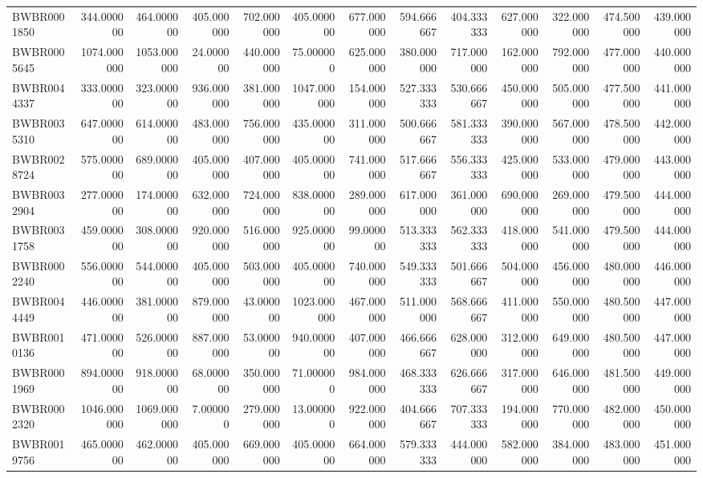 \begin{longtable}{lrrrrrrrrrrrr}
BWBR0001850 & 344.000000 & 464.000000 & 405.000000 & 702.000000 & 405.000000 & 677.000000 & 594.666667 & 404.333333 & 627.000000 & 322.000000 & 474.500000 & 439.000000 \\
BWBR0005645 & 1074.000000 & 1053.000000 & 24.000000 & 440.000000 & 75.000000 & 625.000000 & 380.000000 & 717.000000 & 162.000000 & 792.000000 & 477.000000 & 440.000000 \\
BWBR0044337 & 333.000000 & 323.000000 & 936.000000 & 381.000000 & 1047.000000 & 154.000000 & 527.333333 & 530.666667 & 450.000000 & 505.000000 & 477.500000 & 441.000000 \\
BWBR0035310 & 647.000000 & 614.000000 & 483.000000 & 756.000000 & 435.000000 & 311.000000 & 500.666667 & 581.333333 & 390.000000 & 567.000000 & 478.500000 & 442.000000 \\
BWBR0028724 & 575.000000 & 689.000000 & 405.000000 & 407.000000 & 405.000000 & 741.000000 & 517.666667 & 556.333333 & 425.000000 & 533.000000 & 479.000000 & 443.000000 \\
BWBR0032904 & 277.000000 & 174.000000 & 632.000000 & 724.000000 & 838.000000 & 289.000000 & 617.000000 & 361.000000 & 690.000000 & 269.000000 & 479.500000 & 444.000000 \\
BWBR0031758 & 459.000000 & 308.000000 & 920.000000 & 516.000000 & 925.000000 & 99.000000 & 513.333333 & 562.333333 & 418.000000 & 541.000000 & 479.500000 & 444.000000 \\
BWBR0002240 & 556.000000 & 544.000000 & 405.000000 & 503.000000 & 405.000000 & 740.000000 & 549.333333 & 501.666667 & 504.000000 & 456.000000 & 480.000000 & 446.000000 \\
BWBR0044449 & 446.000000 & 381.000000 & 879.000000 & 43.000000 & 1023.000000 & 467.000000 & 511.000000 & 568.666667 & 411.000000 & 550.000000 & 480.500000 & 447.000000 \\
BWBR0010136 & 471.000000 & 526.000000 & 887.000000 & 53.000000 & 940.000000 & 407.000000 & 466.666667 & 628.000000 & 312.000000 & 649.000000 & 480.500000 & 447.000000 \\
BWBR0001969 & 894.000000 & 918.000000 & 68.000000 & 350.000000 & 71.000000 & 984.000000 & 468.333333 & 626.666667 & 317.000000 & 646.000000 & 481.500000 & 449.000000 \\
BWBR0002320 & 1046.000000 & 1069.000000 & 7.000000 & 279.000000 & 13.000000 & 922.000000 & 404.666667 & 707.333333 & 194.000000 & 770.000000 & 482.000000 & 450.000000 \\
BWBR0019756 & 465.000000 & 462.000000 & 405.000000 & 669.000000 & 405.000000 & 664.000000 & 579.333333 & 444.000000 & 582.000000 & 384.000000 & 483.000000 & 451.000000 \\

\end{longtable}
